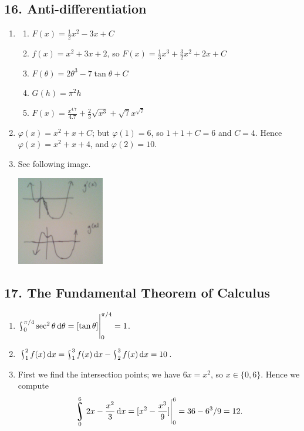 \subsection*{16. Anti-differentiation}
\begin{enumerate}
  \item
    \begin{enumerate}
      \item $ F(x) = \frac{1}{2}x^2 - 3x + C $
      \item $ f(x) = x^2 + 3x + 2 $, so $ F(x) = \frac{1}{3}x^3 + \frac{3}{2}x^2 + 2x + C $
      \item $ F(\theta) = 2\theta^3 - 7\tan \theta + C $
      \item $ G(h) = \pi^2 h$
      \item $ F(x) = \frac{x^{4.7}}{4.7} + \frac{2}{3} \sqrt{x^3} + \sqrt{7}x^{\sqrt{7}} $
    \end{enumerate}
  \item $ \varphi(x) = x^2 + x + C $; but $ \varphi(1) = 6 $, so $ 1 + 1 + C = 6 $ and $ C = 4 $. Hence $ \varphi(x) = x^2 + x + 4 $, and $ \varphi(2) = 10 $.
  \item See following image.
        \begin{center}
          \includegraphics[width=0.3\textwidth]{gofx}
        \end{center}
\end{enumerate}

\subsection*{17. The Fundamental Theorem of Calculus}
\begin{enumerate}
  \item $ \rint^{\pi/4}_0 \sec^2 \theta \dif{\theta} = \eval{[\tan \theta]}_0^{\pi/4} = 1 $.
  \item $ \rint^2_1 f(x) \dif{x} = \rint^3_1 f(x) \dif{x} - \rint^3_2 f(x) \dif{x} = 10 $.
  \item First we find the intersection points; we have $ 6x = x^2 $, so $ x \in \{0, 6\} $. Hence we compute
        \begin{displaymath}
          \rint^6_0 2x - \frac{x^2}{3} \dif{x} = \eval{[x^2 - \frac{x^3}{9}]}_0^6 = 36 - 6^3/9 = 12.
        \end{displaymath}
\end{enumerate}

